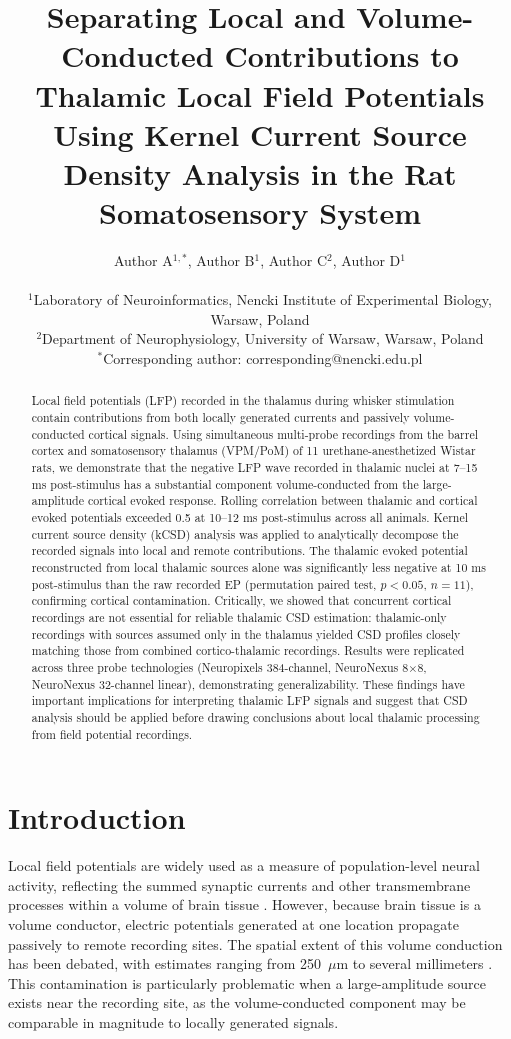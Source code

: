\documentclass[11pt]{article}
\title{Separating Local and Volume-Conducted Contributions to Thalamic Local Field Potentials Using Kernel Current Source Density Analysis in the Rat Somatosensory System}
\author{
Author A$^{1,*}$, Author B$^{1}$, Author C$^{2}$, Author D$^{1}$ \\
\\
\small $^{1}$Laboratory of Neuroinformatics, Nencki Institute of Experimental Biology, Warsaw, Poland \\
\small $^{2}$Department of Neurophysiology, University of Warsaw, Warsaw, Poland \\
\small $^{*}$Corresponding author: corresponding@nencki.edu.pl
}
\date{}
\begin{document}
\maketitle

\begin{abstract}
Local field potentials (LFP) recorded in the thalamus during whisker stimulation contain contributions from both locally generated currents and passively volume-conducted cortical signals. Using simultaneous multi-probe recordings from the barrel cortex and somatosensory thalamus (VPM/PoM) of 11 urethane-anesthetized Wistar rats, we demonstrate that the negative LFP wave recorded in thalamic nuclei at 7--15 ms post-stimulus has a substantial component volume-conducted from the large-amplitude cortical evoked response. Rolling correlation between thalamic and cortical evoked potentials exceeded 0.5 at 10--12 ms post-stimulus across all animals. Kernel current source density (kCSD) analysis was applied to analytically decompose the recorded signals into local and remote contributions. The thalamic evoked potential reconstructed from local thalamic sources alone was significantly less negative at 10 ms post-stimulus than the raw recorded EP (permutation paired test, $p < 0.05$, $n = 11$), confirming cortical contamination. Critically, we showed that concurrent cortical recordings are not essential for reliable thalamic CSD estimation: thalamic-only recordings with sources assumed only in the thalamus yielded CSD profiles closely matching those from combined cortico-thalamic recordings. Results were replicated across three probe technologies (Neuropixels 384-channel, NeuroNexus 8$\times$8, NeuroNexus 32-channel linear), demonstrating generalizability. These findings have important implications for interpreting thalamic LFP signals and suggest that CSD analysis should be applied before drawing conclusions about local thalamic processing from field potential recordings.
\end{abstract}

\section{Introduction}

Local field potentials are widely used as a measure of population-level neural activity, reflecting the summed synaptic currents and other transmembrane processes within a volume of brain tissue \citep{buzsaki2012, einevoll2013}. However, because brain tissue is a volume conductor, electric potentials generated at one location propagate passively to remote recording sites. The spatial extent of this volume conduction has been debated, with estimates ranging from 250~$\mu$m to several millimeters \citep{kajikawa2011, linden2011}. This contamination is particularly problematic when a large-amplitude source exists near the recording site, as the volume-conducted component may be comparable in magnitude to locally generated signals.
\end{document}
